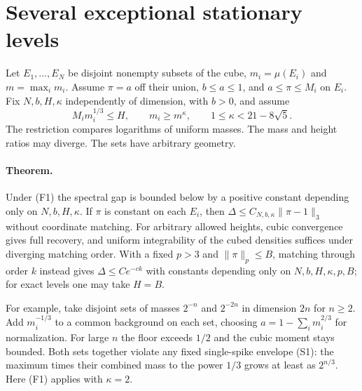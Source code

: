 \section{Several exceptional stationary levels}
\label{sec:several-stationary-levels}
Let $E_1,\ldots,E_N$ be disjoint nonempty subsets of the cube,
$m_i=\mu(E_i)$ and $m=\max_i m_i$. Assume $\pi=a$ off their union,
$b\le a\le1$, and $a\le\pi\le M_i$ on $E_i$. Fix $N,b,H,\kappa$
independently of dimension, with $b>0$, and assume
\[
  M_i m_i^{1/3}\le H,\qquad m_i\ge m^\kappa,\qquad
  1\le\kappa<21-8\sqrt5 . \tag{F1}
\]
The restriction compares logarithms of uniform masses. The mass and height ratios may diverge. The sets have arbitrary geometry.

\paragraph{Theorem.}
Under (F1) the spectral gap is bounded below by a positive constant
depending only on $N,b,H,\kappa$. If $\pi$ is constant on each $E_i$,
then $\Delta\le C_{N,b,\kappa}\|\pi-1\|_3$ without coordinate matching.
For arbitrary allowed heights, cubic convergence gives full recovery,
and uniform integrability of the cubed densities suffices under
diverging matching order. With a fixed $p>3$ and $\|\pi\|_p\le B$, matching
through order $k$ instead gives $\Delta\le C e^{-ck}$ with constants
depending only on $N,b,H,\kappa,p,B$; for exact levels one may take $H=B$.

For example, take disjoint sets of masses $2^{-n}$ and $2^{-2n}$ in
dimension $2n$ for $n\ge2$. Add $m_i^{-1/3}$ to a common background
on each set, choosing $a=1-\sum_i m_i^{2/3}$ for normalization.
For large $n$ the floor exceeds $1/2$ and the cubic moment stays bounded.
Both sets together violate any fixed single-spike envelope (S1):
the maximum times their combined mass to the power $1/3$ grows at
least as $2^{n/3}$. Here (F1) applies with $\kappa=2$.

